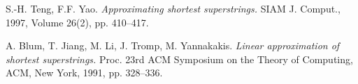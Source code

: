 \documentclass[12pt]{article}
\begin{document}
\begin{thebibliography}{3}
    S.-H. Teng, F.F. Yao.
    \textit{Approximating shortest superstrings.}
    SIAM J. Comput., 1997, Volume 26(2), pp. 410–417.

    A. Blum, T. Jiang, M. Li, J. Tromp, M. Yannakakis.
    \textit{Linear approximation of shortest superstrings.}
    Proc. 23rd ACM Symposium on the Theory of Computing, ACM, New York, 1991, pp. 328–336.
\end{thebibliography}
\end{document}
